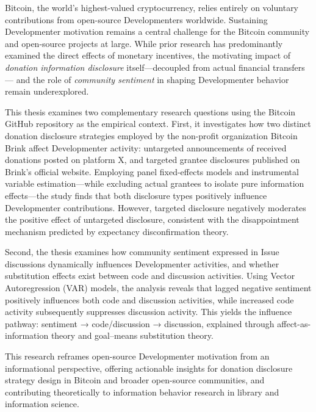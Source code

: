\begin{abstract*}
Bitcoin, the world's highest-valued cryptocurrency, relies entirely on voluntary contributions
from open-source Developmenters worldwide. Sustaining Developmenter motivation remains a central
challenge for the Bitcoin community and open-source projects at large. While prior research
has predominantly examined the direct effects of monetary incentives, the motivating impact
of \textit{donation information disclosure} itself—decoupled from actual financial transfers—
and the role of \textit{community sentiment} in shaping Developmenter behavior remain underexplored.

This thesis examines two complementary research questions using the Bitcoin GitHub repository
as the empirical context. First, it investigates how two distinct donation disclosure
strategies employed by the non-profit organization Bitcoin Brink affect Developmenter activity:
untargeted announcements of received donations posted on platform X, and targeted
grantee disclosures published on Brink's official website. Employing panel fixed-effects
models and instrumental variable estimation—while excluding actual grantees to isolate
pure information effects—the study finds that both disclosure types positively influence
Developmenter contributions. However, targeted disclosure negatively moderates the positive
effect of untargeted disclosure, consistent with the disappointment mechanism predicted
by expectancy disconfirmation theory.

Second, the thesis examines how community sentiment expressed in Issue discussions
dynamically influences Developmenter activities, and whether substitution effects exist between
code and discussion activities. Using Vector Autoregression (VAR) models, the analysis
reveals that lagged negative sentiment positively influences both code and discussion
activities, while increased code activity subsequently suppresses discussion activity.
This yields the influence pathway: sentiment → code/discussion → discussion, explained
through affect-as-information theory and goal–means substitution theory.

This research reframes open-source Developmenter motivation from an informational perspective,
offering actionable insights for donation disclosure strategy design in Bitcoin and
broader open-source communities, and contributing theoretically to information behavior
research in library and information science.
\end{abstract*}

